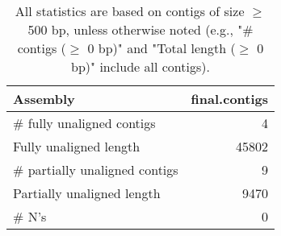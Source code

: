 \documentclass[12pt,a4paper]{article}
\begin{document}
\begin{table}[ht]
\begin{center}
\caption{All statistics are based on contigs of size $\geq$ 500 bp, unless otherwise noted (e.g., "\# contigs ($\geq$ 0 bp)" and "Total length ($\geq$ 0 bp)" include all contigs).}
\begin{tabular}{|l*{1}{|r}|}
\hline
Assembly & final.contigs \\ \hline
\# fully unaligned contigs & 4 \\ \hline
Fully unaligned length & 45802 \\ \hline
\# partially unaligned contigs & 9 \\ \hline
Partially unaligned length & 9470 \\ \hline
\# N's & 0 \\ \hline
\end{tabular}
\end{center}
\end{table}
\end{document}
